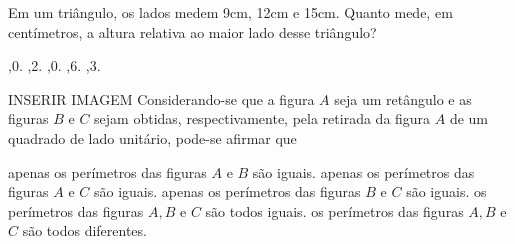 \begin{question}%
Em um triângulo, os lados medem 9cm, 12cm e 15cm. Quanto mede, em centímetros, a altura relativa ao maior lado desse triângulo?
    \begin{tasks}
        ,0.
        ,2.
        ,0.
        ,6.
        ,3.
    \end{tasks}
\end{question}

\begin{question}%
INSERIR IMAGEM
Considerando-se que a figura \(A\) seja um retângulo e as figuras \(B\) e \(C\) sejam obtidas, respectivamente, pela retirada da figura \(A\) de um quadrado de lado unitário, pode-se afirmar que
    \begin{tasks}
        \task apenas os perímetros das figuras \(A\) e \(B\) são iguais.
        \task apenas os perímetros das figuras \(A\) e \(C\) são iguais.
        \task apenas os perímetros das figuras \(B\) e \(C\) são iguais.
        \task os perímetros das figuras \(A,B\) e \(C\) são todos iguais.
        \task os perímetros das figuras \(A,B\) e \(C\) são todos diferentes.
    \end{tasks}
\end{question}
